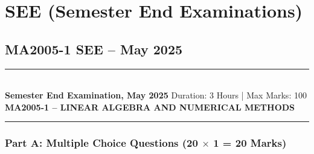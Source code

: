 \documentclass[11pt,a4paper]{article}
\newcommand{\examheader}[4]{
\noindent\rule{\textwidth}{0.5pt}\\
\textbf{#1} \hfill Duration: #3 | Max Marks: #4\\
\textbf{#2}\\
\rule{\textwidth}{0.5pt}
\vspace{0.2cm}
}
\begin{document}
\section{SEE (Semester End Examinations)}

\subsection{MA2005-1 SEE -- May 2025}
\examheader{Semester End Examination, May 2025}{MA2005-1 -- LINEAR ALGEBRA AND NUMERICAL METHODS}{3 Hours}{100}

\subsubsection*{Part A: Multiple Choice Questions (20 $\times$ 1 = 20 Marks)}
\end{document}

